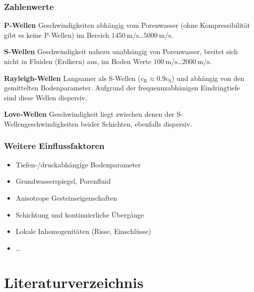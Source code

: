 \documentclass[hyperref={pdfpagemode=FullScreen, colorlinks=false}]{beamer}
\begin{document}
\begin{frame}
\frametitle{Zahlenwerte}
\textbf{P-Wellen}
Geschwindigkeiten abhängig vom Porenwasser (ohne Kompressibilität gibt es keine P-Wellen) im Bereich $\SI{1450}{\metre\per\second}$\dots $\SI{5000}{\metre\per\second}$.

\bigskip

\textbf{S-Wellen}
Geschwindigkeit nahezu unabhängig von Porenwasser, breitet sich nicht in Fluiden (Erdkern) aus, im Boden Werte $\SI{100}{\metre\per\second}$\dots $\SI{2000}{\metre\per\second}$.

\bigskip

\textbf{Rayleigh-Wellen}
Langsamer als S-Wellen ($c_\mathrm{R}\approx 0.9 c_\mathrm{S}$) und abhängig von den gemittelten Bodenparameter. Aufgrund der frequenuzabhänigen Eindringtiefe sind diese Wellen dispersiv.

\bigskip

\textbf{Love-Wellen}
Geschwindigkeit liegt zwischen denen der S-Wellengeschwindigkeiten beider Schichten, ebenfalls dispersiv.


\end{frame}



\begin{frame}
\frametitle{Weitere Einflussfaktoren}
\begin{itemize}
 \item Tiefen-/druckabhängige Bodenparameter 
 \item Grundwasserspiegel, Porenfluid
 \item Anisotrope Gesteinseigenschaften
 \item Schichtung und kontinuierliche Übergänge
 \item Lokale Inhomogenitäten (Risse, Einschlüsse)
 \item \dots
\end{itemize}

\end{frame}




\section*{Literaturverzeichnis}

\begin{frame}[allowframebreaks]{}
	\printbibliography
\end{frame}
\end{document}

